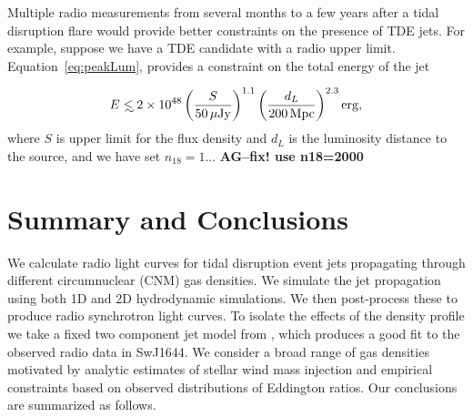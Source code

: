 \documentclass[usenatbib,fleqn]{mnras}
\newcommand\lsim{\mathrel{\rlap{\lower4pt\hbox{\hskip1pt$\sim$}}
    \raise1pt\hbox{$<$}}}
\begin{document}
Multiple radio measurements from several months to a few years after a
tidal disruption flare would provide better constraints on the
presence of TDE jets. For example, suppose we have a TDE candidate
with a radio upper limit. Equation~\eqref{eq:peakLum}, provides a
constraint on the total energy of the jet


\begin{equation}
E\lsim 2 \times 10^{48} \left(\frac{S}{50 \,\mu{\rm Jy}}\right)^{1.1}
  \left(\frac{d_L}{200 \,{\rm Mpc}}\right)^{2.3} {\rm erg},
\end{equation}
%
where $S$ is upper limit for the flux density and $d_L$ is the
luminosity distance to the source, and we have set $n_{18}=1$...{\bf
  AG--fix! use n18=2000} 

\section{Summary and Conclusions}
\label{sec:conc}

We calculate radio light curves for tidal disruption event jets
propagating through different circumnuclear (CNM) gas densities. We
simulate the jet propagation using both 1D and 2D hydrodynamic
simulations. We then post-process these to produce radio synchrotron
light curves. To isolate the effects of the density profile we take a
fixed two component jet model from \citet{Mimica+2015}, which produces
a good fit to the observed radio data in SwJ1644. We
consider a broad range of gas densities motivated by analytic
estimates of stellar wind mass injection and empirical constraints
based on observed distributions of Eddington ratios. Our conclusions
are summarized as follows.
\end{document}
